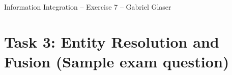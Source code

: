 \documentclass{scrartcl}
\begin{document}
	\begin{center}
		\LARGE
		Information Integration -- Exercise 7 -- Gabriel Glaser
	\end{center}
	
	\section*{Task 3: Entity Resolution and Fusion (Sample exam question)}
	\begin{center}
	\end{center}
\end{document}
